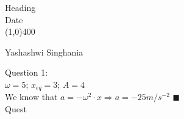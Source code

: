 \documentclass{article}
\begin{document}
\begin{titlepage}

\begin{center}
\Huge{Heading}\\
\Large{Date}\\
\vfill
\line(1,0){400}\\
\begin{large}
Yashashwi Singhania
\end{large}
\end{center}
\end{titlepage}
Question 1:\\
$\omega =5$;
$x_{eq}=3$;
$A=4$\\
We know that $a=-\omega^2 \cdot x \Rightarrow a=-25 m/s^{-2} $  $\blacksquare$\\
Quest
\end{document}
